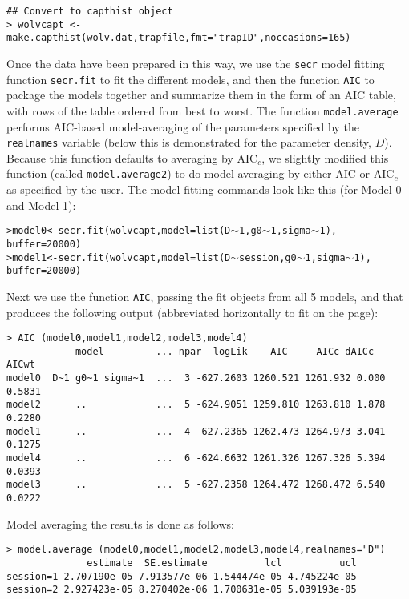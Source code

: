 {{\begin{verbatim}
## Convert to capthist object
> wolvcapt <- make.capthist(wolv.dat,trapfile,fmt="trapID",noccasions=165)
\end{verbatim}
}

Once the data have been prepared in this way, we use the
\mbox{\tt secr} model fitting function \mbox{\tt secr.fit} to fit the
different models, and then the function \mbox{\tt AIC} to
package the models together and summarize them in the form of an AIC
table, with rows of the table ordered from best to worst. The function
\mbox{\tt model.average} performs AIC-based model-averaging of the
parameters specified by the \mbox{\tt realnames} variable (below this
is demonstrated for the parameter density, $D$).  Because this
function defaults to averaging by AIC$_c$, we slightly modified
this function (called \mbox{\tt model.average2}) to do model averaging
by either  AIC or AIC$_c$ as specified by the user. The model fitting
commands look like this (for Model 0 and Model 1):
{\small
\begin{alltt}
> model0 <- secr.fit(wolvcapt, model=list(D\(\sim\)1, g0\(\sim\)1, sigma\(\sim\)1), 
                  buffer=20000)
> model1 <- secr.fit(wolvcapt, model=list(D\(\sim\)session, g0\(\sim\)1, sigma\(\sim\)1), 
                  buffer=20000)
\end{alltt}
}
Next we use the function \mbox{\tt AIC}, passing the fit objects from
all 5 models, and that produces the following output (abbreviated
horizontally to fit on the page):
{\small
\begin{verbatim}
> AIC (model0,model1,model2,model3,model4)
            model         ... npar  logLik    AIC     AICc dAICc  AICwt
model0  D~1 g0~1 sigma~1  ...  3 -627.2603 1260.521 1261.932 0.000 0.5831
model2      ..            ...  5 -624.9051 1259.810 1263.810 1.878 0.2280
model1      ..            ...  4 -627.2365 1262.473 1264.973 3.041 0.1275
model4      ..            ...  6 -624.6632 1261.326 1267.326 5.394 0.0393
model3      ..            ...  5 -627.2358 1264.472 1268.472 6.540 0.0222
\end{verbatim}
}
Model averaging the results is done as follows:
{\small 
\begin{verbatim}
> model.average (model0,model1,model2,model3,model4,realnames="D")
              estimate  SE.estimate          lcl          ucl
session=1 2.707190e-05 7.913577e-06 1.544474e-05 4.745224e-05
session=2 2.927423e-05 8.270402e-06 1.700631e-05 5.039193e-05
\end{verbatim}
}}
